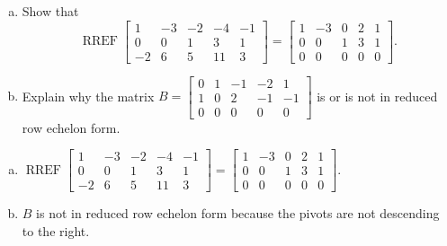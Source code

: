 
\begin{exerciseStatement}

\begin{enumerate}[(a)]
\item Show that \[\operatorname{RREF} \left[\begin{array}{ccccc}
1 & -3 & -2 & -4 & -1 \\
0 & 0 & 1 & 3 & 1 \\
-2 & 6 & 5 & 11 & 3
\end{array}\right] = \left[\begin{array}{ccccc}
1 & -3 & 0 & 2 & 1 \\
0 & 0 & 1 & 3 & 1 \\
0 & 0 & 0 & 0 & 0
\end{array}\right] .\]
\item Explain why the matrix \(B= \left[\begin{array}{ccccc}
0 & 1 & -1 & -2 & 1 \\
1 & 0 & 2 & -1 & -1 \\
0 & 0 & 0 & 0 & 0
\end{array}\right] \) is or is not in reduced row echelon form.
\end{enumerate}
    
\end{exerciseStatement}
    
\begin{exerciseAnswer} 

\begin{enumerate}[(a)]
\item \(\operatorname{RREF} \left[\begin{array}{ccccc}
1 & -3 & -2 & -4 & -1 \\
0 & 0 & 1 & 3 & 1 \\
-2 & 6 & 5 & 11 & 3
\end{array}\right] = \left[\begin{array}{ccccc}
1 & -3 & 0 & 2 & 1 \\
0 & 0 & 1 & 3 & 1 \\
0 & 0 & 0 & 0 & 0
\end{array}\right] .\)
\item \(B\) is not in reduced row echelon form because the pivots are not descending to the right. 
\end{enumerate}
    
\end{exerciseAnswer}
    
